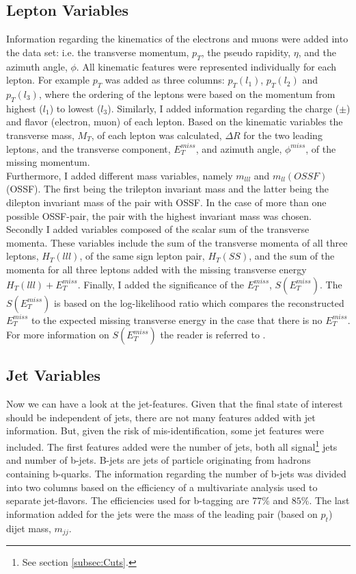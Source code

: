 \subsection{Lepton Variables}\label{subsec:LepSel}
Information regarding the kinematics of the electrons and muons were added into the data set: i.e. the transverse momentum, $p_T$, the pseudo 
rapidity, $\eta$, and the azimuth angle, $\phi$. All kinematic features were represented individually for each lepton. For example $p_T$
was added as three columns: $p_T(l_1)$, $p_T(l_2)$ and $p_T(l_3)$, where the ordering of the leptons were based on the momentum from highest ($l_1$) 
to lowest ($l_3$). Similarly, I added information regarding the charge ($\pm$) and flavor (electron, muon) of each lepton. Based on the kinematic variables
the transverse mass, $M_T$, of each lepton was calculated, $\Delta R$ for the two leading leptons, and the transverse component, $E_T^{miss}$, and azimuth angle,
$\phi^{miss}$, of the missing momentum.
\\
Furthermore, I added different mass variables, namely $m_{lll}$ and $m_{ll}(OSSF)$ (\ac{OSSF}). The first being the trilepton invariant mass 
and the latter being the dilepton invariant mass of the pair with \ac{OSSF}. In the case of more than one possible \ac{OSSF}-pair,
the pair with the highest invariant mass was chosen. Secondly I added variables composed of the scalar sum of the transverse momenta.
These variables include the sum of the transverse momenta of all three leptons, $H_T(lll)$, of the same sign lepton pair, $H_T(SS)$, and the sum of 
the momenta for all three leptons added with the missing transverse energy $H_T(lll) + E_T^{miss}$. Finally, I added the significance of the
$E_T^{miss}$, $S(E_T^{miss})$. The $S(E_T^{miss})$ is based on the log-likelihood ratio which compares the reconstructed $E_T^{miss}$ to 
the expected missing transverse energy in the case that there is no $E_T^{miss}$. For more information on $S(E_T^{miss})$ the reader is 
referred to \cite{object_based_2018}.
\subsection{Jet Variables}\label{subsec:JetSel}
Now we can have a look at the jet-features. Given that the final state of interest should be independent of jets, there are 
not many features added with jet information. But, given the risk of mis-identification, some jet features were included. The 
first features added were the number of jets, both all signal\footnote{See section \ref{subsec:Cuts}.} jets and number of b-jets.
B-jets are jets of particle originating from hadrons containing b-quarks. The information regarding the number of b-jets was divided into 
two columns based on the efficiency of a multivariate analysis used to separate jet-flavors. The efficiencies used for b-tagging are $77\%$ and $85\%$. 
The last information added for the jets were the mass of the leading pair (based on $p_t$) dijet mass, $m_{jj}$.